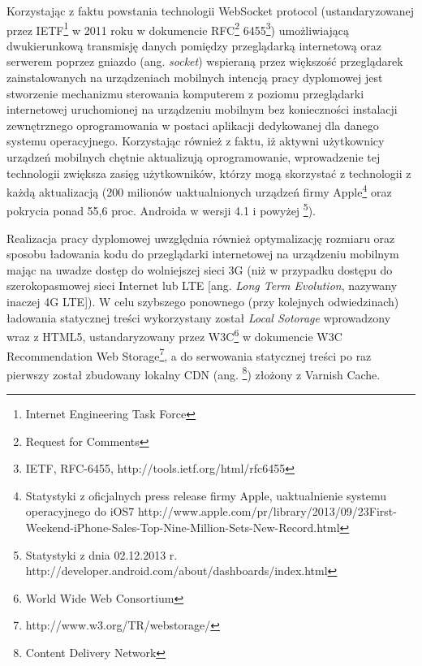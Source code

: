 Korzystając z faktu powstania technologii WebSocket protocol (ustandaryzowanej przez IETF\footnote{Internet Engineering Task Force} w 2011 roku w dokumencie RFC\footnote{Request for Comments} 6455\footnote{IETF, RFC-6455, http://tools.ietf.org/html/rfc6455}) umożliwiającą dwukierunkową transmisję danych pomiędzy przeglądarką internetową oraz serwerem poprzez gniazdo (ang. \emph{socket}) wspieraną przez większość przeglądarek zainstalowanych na urządzeniach mobilnych intencją pracy dyplomowej jest stworzenie mechanizmu sterowania komputerem z poziomu przeglądarki internetowej uruchomionej na urządzeniu mobilnym bez konieczności instalacji zewnętrznego oprogramowania w postaci aplikacji dedykowanej dla danego systemu operacyjnego. Korzystając również z faktu, iż aktywni użytkownicy urządzeń mobilnych chętnie aktualizują oprogramowanie, wprowadzenie tej technologii zwiększa zasięg użytkowników, którzy mogą skorzystać z technologii z każdą aktualizacją (200 milionów uaktualnionych urządzeń firmy Apple\footnote{Statystyki z oficjalnych press release firmy Apple, uaktualnienie systemu operacyjnego do iOS7 http://www.apple.com/pr/library/2013/09/23First-Weekend-iPhone-Sales-Top-Nine-Million-Sets-New-Record.html} oraz pokrycia ponad 55,6 proc. Androida w wersji 4.1 i powyżej \footnote{Statystyki z dnia 02.12.2013 r. http://developer.android.com/about/dashboards/index.html}).

Realizacja pracy dyplomowej uwzględnia również optymalizację rozmiaru oraz sposobu ładowania kodu do przeglądarki internetowej na urządzeniu mobilnym mając na uwadze dostęp do wolniejszej sieci 3G (niż w przypadku dostępu do szerokopasmowej sieci Internet lub LTE [ang. \emph{ Long Term Evolution}, nazywany inaczej 4G LTE]). W celu szybszego ponownego (przy kolejnych odwiedzinach) ładowania statycznej treści wykorzystany został \emph{Local Sotorage} wprowadzony wraz z HTML5, ustandaryzowany przez W3C\footnote{World Wide Web Consortium} w dokumencie W3C Recommendation Web Storage\footnote{http://www.w3.org/TR/webstorage/}, a do serwowania statycznej treści po raz pierwszy został zbudowany lokalny CDN (ang. \footnote{Content Delivery Network}) złożony z Varnish Cache.
